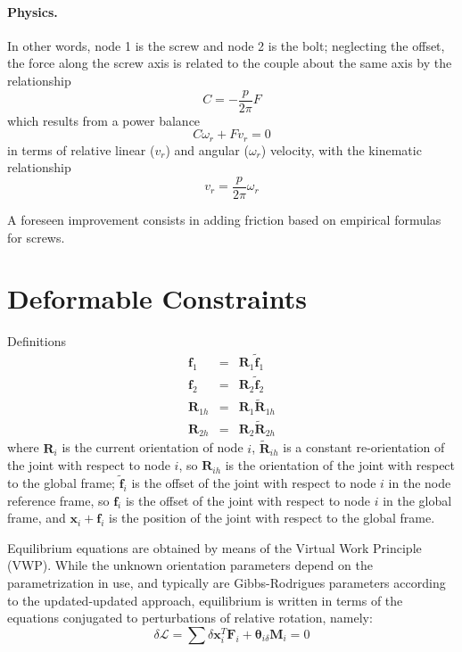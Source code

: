 \documentclass[10pt,dvips,fleqn,subeqn]{report}
\newcommand{\T}[1]{\bm{#1}}
\begin{document}
\paragraph{Physics.}
In other words, node 1 is the screw and node 2 is the bolt;
neglecting the offset, the force along the screw axis is related
to the couple about the same axis by the relationship
\begin{equation}
	C = - \frac{p}{2\pi} F
\end{equation}
which results from a power balance
\begin{equation}
	C \omega_r + F v_r = 0
\end{equation}
in terms of relative linear ($v_r$) and angular ($\omega_r$) velocity,
with the kinematic relationship
\begin{equation} 
	v_r = \frac{p}{2\pi} \omega_r
\end{equation}

A foreseen improvement consists in adding friction based on empirical
formulas for screws.







\section{Deformable Constraints}
Definitions
\begin{eqnarray*}
	\T{f}_1 & = & \T{R}_1 \tilde{\T{f}}_1 \\
	\T{f}_2 & = & \T{R}_2 \tilde{\T{f}}_2 \\
	\T{R}_{1h} & = & \T{R}_1 \tilde{\T{R}}_{1h} \\
	\T{R}_{2h} & = & \T{R}_2 \tilde{\T{R}}_{2h}
\end{eqnarray*}
where $\T{R}_i$ is the current orientation of node $i$, 
$\tilde{\T{R}}_{ih}$ is a constant re-orientation of the joint
with respect to node $i$, so $\T{R}_{ih}$ is the orientation
of the joint with respect to the global frame;
$\tilde{\T{f}}_i$ is the offset of the joint with respect to
node $i$ in the node reference frame, so $\T{f}_i$ is the offset 
of the joint with respect to node $i$ in the global frame, and
$\T{x}_i+\T{f}_i$ is the position of the joint with respect 
to the global frame.

Equilibrium equations are obtained by means of the Virtual Work
Principle (VWP).
While the unknown orientation parameters depend on the parametrization 
in use, and typically are Gibbs-Rodrigues parameters according 
to the updated-updated approach, equilibrium is written in terms
of the equations conjugated to perturbations of relative rotation,
namely:
\begin{equation}
	\delta\mathcal{L} = \sum \delta\T{x}_i^T \T{F}_i
	+ \T{\theta}_{i\delta} \T{M}_i = 0
\end{equation}
\end{document}
